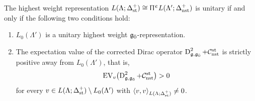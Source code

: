\begin{theorem}
The highest weight representation $L(\Lambda;\Delta_{{\text{st}}}^{+})\cong  \Uppi^{\upepsilon}L(\Lambda';\Delta_{{\text{nst}}}^{+})$ is unitary if and only if the following two conditions hold:
\begin{enumerate}
\item[(a)] $L_0(\Lambda')$ is a unitary highest weight ${\mathfrak{g}_{\bar{0}}}$-representation.
\item[(b)] The expectation value of the corrected Dirac operator $\operatorname{D}_{{\mathfrak{g}},{\mathfrak{g}_{\bar{0}}}}^{2}+\mathcal C_{{\text{nst}}}^{{\text{st}}}$ is strictly positive away from $L_0(\Lambda')$, that is,
\begin{equation*}
{\text{EV}}_v\bigl(\operatorname{D}_{{\mathfrak{g}},{\mathfrak{g}_{\bar{0}}}}^{2}+\mathcal C_{{\text{nst}}}^{{\text{st}}}\bigr)>0
\end{equation*}
for every $v\in L(\Lambda;\Delta_{{\text{st}}}^{+})\setminus L_0(\Lambda')$ with $\langle v,v\rangle_{L(\Lambda;\Delta_{{\text{st}}}^{+})}\neq0$.
\end{enumerate}
\end{theorem}

